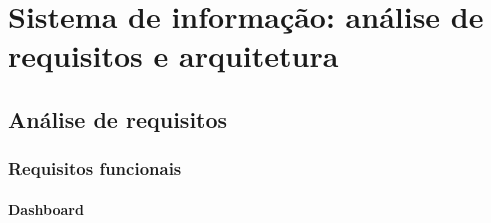 

\chapter{Sistema de informação: análise de requisitos e arquitetura}






\section{Análise de requisitos}





\subsection{Requisitos funcionais}







\subsubsection{Dashboard}


